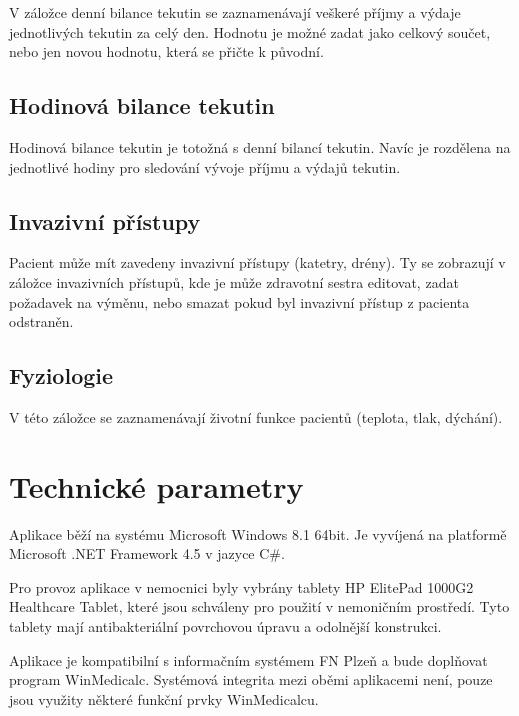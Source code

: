\documentclass{template_svk}
\begin{document}
V záložce denní bilance tekutin se zaznamenávají veškeré příjmy a výdaje jednotlivých tekutin za celý den. Hodnotu je možné zadat jako celkový součet, nebo jen novou hodnotu, která se přičte k původní.


\subsection{Hodinová bilance tekutin}

Hodinová bilance tekutin je totožná s denní bilancí tekutin. Navíc je rozdělena na jednotlivé hodiny pro sledování vývoje příjmu a výdajů tekutin.


\subsection{Invazivní přístupy}

Pacient může mít zavedeny invazivní přístupy (katetry, drény). Ty se zobrazují v záložce invazivních přístupů, kde je může zdravotní sestra editovat, zadat požadavek na výměnu, nebo smazat pokud byl invazivní přístup z pacienta odstraněn.


\subsection{Fyziologie}

V této záložce se zaznamenávají životní funkce pacientů (teplota, tlak, dýchání).


\section{Technické parametry}

Aplikace běží na systému Microsoft Windows 8.1 64bit. Je vyvíjená na platformě Microsoft .NET Framework 4.5 v jazyce C\#.

Pro provoz aplikace v nemocnici byly vybrány tablety HP ElitePad 1000G2 Healthcare Tablet, které jsou schváleny pro použití v nemoničním prostředí. Tyto tablety mají antibakteriální povrchovou úpravu a odolnější konstrukci.

Aplikace je kompatibilní s informačním systémem FN Plzeň a bude doplňovat program WinMedicalc. Systémová integrita mezi oběmi aplikacemi není, pouze jsou využity některé funkční prvky WinMedicalcu.

\end{document}
